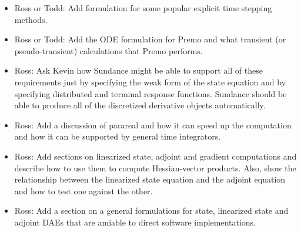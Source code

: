 \documentclass[pdf,ps2pdf,11pt]{SANDreport}
\begin{document}
\begin{itemize}
%
{}\item Ross or Todd: Add formulation for some popular explicit time stepping
methods.
%
%
%
{}\item Ross or Todd: Add the ODE formulation for Premo and what transient (or
pseudo-transient) calculations that Premo performs.
%
{}\item Ross: Ask Kevin how Sundance might be able to support all of these
requirements just by specifying the weak form of the state equation and by
specifying distributed and terminal response functions.  Sundance should be
able to produce all of the discretized derivative objects automatically.
%
{}\item Ross: Add a discussion of parareal and how it can speed up the
computation and how it can be supported by general time integrators.
%
{}\item Ross: Add sections on linearized state, adjoint and gradient
computations and describe how to use them to compute Hessian-vector products.
Also, show the relationship between the linearized state equation and the
adjoint equation and how to test one against the other.
%
{}\item Ross: Add a section on a general formulations for state, linearized
state and adjoint DAEs that are amiable to direct software implementations.
%
\end{itemize}

\begin{SANDdistribution}
\end{SANDdistribution}
\end{document}

